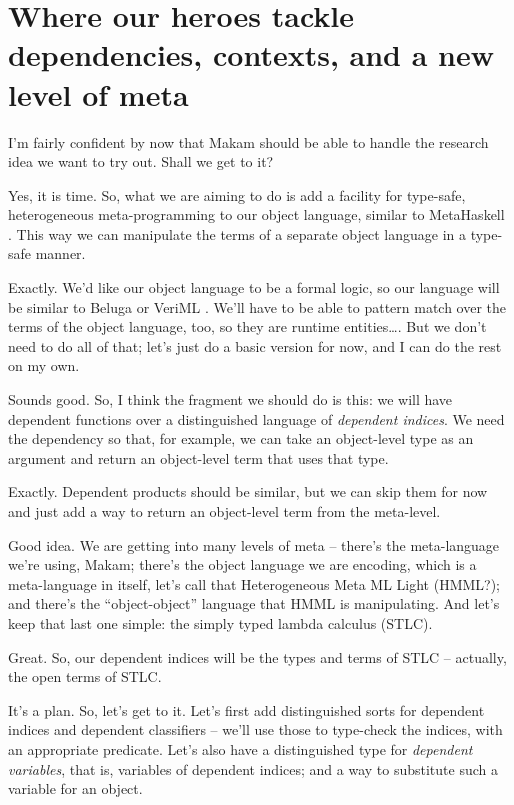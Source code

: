 \section{Where our heroes tackle dependencies, contexts, and a new level
of
meta}\label{where-our-heroes-tackle-dependencies-contexts-and-a-new-level-of-meta}

\heroSTUDENT{} I'm fairly confident by now that Makam should be able to handle
the research idea we want to try out. Shall we get to it?

\heroADVISOR{} Yes, it is time. So, what we are aiming to do is add a facility
for type-safe, heterogeneous meta-programming to our object language,
similar to MetaHaskell \citep{mainland2012explicitly}. This way we can
manipulate the terms of a separate object language in a type-safe
manner.

\heroSTUDENT{} Exactly. We'd like our object language to be a formal logic, so
our language will be similar to Beluga \citep{pientka2010beluga} or
VeriML \citep{stampoulis2013veriml}. We'll have to be able to pattern
match over the terms of the object language, too, so they are runtime
entities\ldots{}. But we don't need to do all of that; let's just do a
basic version for now, and I can do the rest on my own.

\heroADVISOR{} Sounds good. So, I think the fragment we should do is this: we
will have dependent functions over a distinguished language of
\emph{dependent indices}. We need the dependency so that, for example,
we can take an object-level type as an argument and return an
object-level term that uses that type.

\heroSTUDENT{} Exactly. Dependent products should be similar, but we can skip
them for now and just add a way to return an object-level term from the
meta-level.

\heroADVISOR{} Good idea. We are getting into many levels of meta -- there's
the meta-language we're using, Makam; there's the object language we are
encoding, which is a meta-language in itself, let's call that
Heterogeneous Meta ML Light (HMML?); and there's the ``object-object''
language that HMML is manipulating. And let's keep that last one simple:
the simply typed lambda calculus (STLC).

\heroSTUDENT{} Great. So, our dependent indices will be the types and terms of
STLC -- actually, the open terms of STLC.

\heroADVISOR{} It's a plan. So, let's get to it. Let's first add distinguished
sorts for dependent indices and dependent classifiers -- we'll use those
to type-check the indices, with an appropriate predicate. Let's also
have a distinguished type for \emph{dependent variables}, that is,
variables of dependent indices; and a way to substitute such a variable
for an object.

